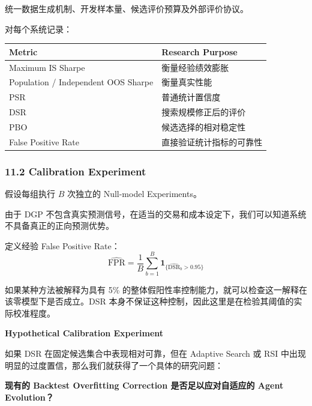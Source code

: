 统一数据生成机制、开发样本量、候选评价预算及外部评价协议。

对每个系统记录：

\begin{readertable}
\begin{longtable}[]{@{}
  >{\raggedright\arraybackslash}p{}
  >{\raggedright\arraybackslash}p{}@{}}
\toprule
Metric & Research Purpose \\
\midrule
\endhead
Maximum IS Sharpe & 衡量经验绩效膨胀 \\
Population / Independent OOS Sharpe & 衡量真实性能 \\
PSR & 普通统计置信度 \\
DSR & 搜索规模修正后的评价 \\
PBO & 候选选择的相对稳定性 \\
False Positive Rate & 直接验证统计指标的可靠性 \\
\bottomrule
\end{longtable}
\end{readertable}

\hypertarget{part-4-71-0001-calibration-experiment}{%
\subsubsection{11.2 Calibration Experiment}\label{part-4-71-0001-calibration-experiment}}

假设每组执行 \(B\) 次独立的 Null-model Experiments。

由于 DGP 不包含真实预测信号，在适当的交易和成本设定下，我们可以知道系统不具备真正的正向预测优势。

定义经验 False Positive Rate：
\[\boxed{
\widehat{\mathrm{FPR}}
=
\frac1B
\sum_{b=1}^{B}
\mathbf 1_{\{
\widehat{\mathrm{DSR}}_b>0.95
\}}
}\]

如果某种方法被解释为具有 5\% 的整体假阳性率控制能力，就可以检查这一解释在该零模型下是否成立。DSR 本身不保证这种控制，因此这里是在检验其阈值的实际校准程度。

\textbf{Hypothetical Calibration Experiment}


如果 DSR 在固定候选集合中表现相对可靠，但在 Adaptive Search 或 RSI 中出现明显的过度置信，那么我们就获得了一个具体的研究问题：

\textbf{现有的 Backtest Overfitting Correction 是否足以应对自适应的 Agent Evolution？}

